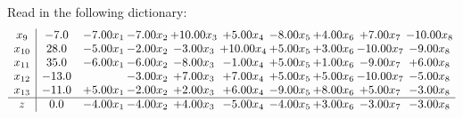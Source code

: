 \documentclass[9pt]{article}
\begin{document}
Read in the following dictionary:
\[\begin{array}{c| c c@{\hskip 2pt} c@{\hskip 2pt} c@{\hskip 2pt} c@{\hskip 2pt} c@{\hskip 2pt} c@{\hskip 2pt} c@{\hskip 2pt} c@{\hskip 2pt} }
 x_{9}   &  -7.0 & -7.00 x_{1} & -7.00 x_{2} & + 10.00 x_{3} & +  5.00 x_{4} & -8.00 x_{5} & +  4.00 x_{6} & +  7.00 x_{7} & -10.00 x_{8}\\
 x_{10}   &  28.0 & -5.00 x_{1} & -2.00 x_{2} & -3.00 x_{3} & + 10.00 x_{4} & +  5.00 x_{5} & +  3.00 x_{6} & -10.00 x_{7} & -9.00 x_{8}\\
 x_{11}   &  35.0 & -6.00 x_{1} & -6.00 x_{2} & -8.00 x_{3} & -1.00 x_{4} & +  5.00 x_{5} & +  1.00 x_{6} & -9.00 x_{7} & +  6.00 x_{8}\\
 x_{12}   &  -13.0  &   & -3.00 x_{2} & +  7.00 x_{3} & +  7.00 x_{4} & +  5.00 x_{5} & +  5.00 x_{6} & -10.00 x_{7} & -5.00 x_{8}\\
 x_{13}   &  -11.0 & +  5.00 x_{1} & -2.00 x_{2} & +  2.00 x_{3} & +  6.00 x_{4} & -9.00 x_{5} & +  8.00 x_{6} & +  5.00 x_{7} & -3.00 x_{8}\\
\hline
z    &  0.0 & -4.00 x_{1} & -4.00 x_{2} & +  4.00 x_{3} & -5.00 x_{4} & -4.00 x_{5} & +  3.00 x_{6} & -3.00 x_{7} & -3.00 x_{8}\\
\end{array}\]
\end{document}
